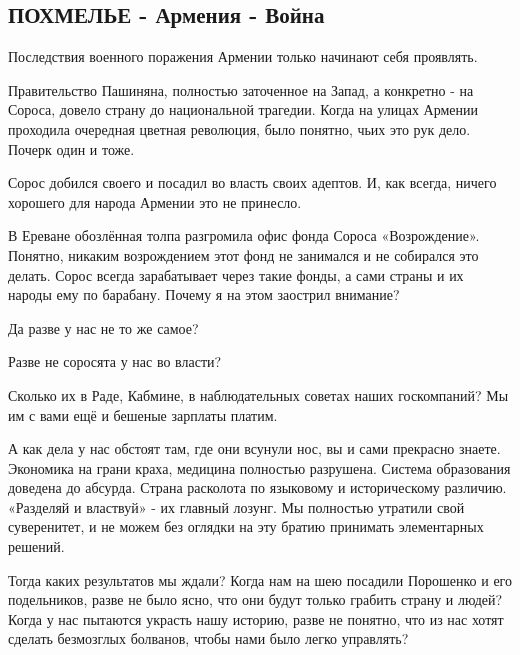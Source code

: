  
 
 

\subsection{ПОХМЕЛЬЕ - Армения - Война}


Последствия военного поражения Армении только начинают себя проявлять.

Правительство Пашиняна, полностью заточенное на Запад, а конкретно - на Сороса,
довело страну до национальной трагедии. Когда на улицах Армении проходила
очередная цветная революция, было понятно, чьих это рук дело. Почерк один и
тоже.

Сорос добился своего и посадил во власть своих адептов. И, как всегда, ничего
хорошего для народа Армении это не принесло. 

В Ереване обозлённая толпа разгромила офис фонда Сороса «Возрождение». Понятно,
никаким возрождением этот фонд не занимался и не собирался это делать. Сорос
всегда зарабатывает через такие фонды, а сами страны и их народы ему по
барабану. Почему я на этом заострил внимание? 

Да разве у нас не то же самое? 

Разве не соросята у нас во власти? 

Сколько их в Раде, Кабмине, в наблюдательных советах наших госкомпаний? Мы им с
вами ещё и бешеные зарплаты платим. 

А как дела у нас обстоят там,  где они всунули нос, вы и сами прекрасно знаете.
Экономика на грани краха, медицина полностью разрушена. Система образования
доведена до абсурда. Страна расколота по языковому и историческому различию.
«Разделяй и властвуй» - их главный лозунг. Мы полностью утратили свой
суверенитет, и не можем без оглядки на эту братию принимать элементарных
решений. 

Тогда каких результатов мы ждали? Когда нам на шею посадили Порошенко и его
подельников, разве не было ясно, что они будут только грабить страну и людей?
Когда у нас пытаются украсть нашу историю, разве не понятно, что из нас хотят
сделать безмозглых болванов, чтобы нами было легко управлять? 


